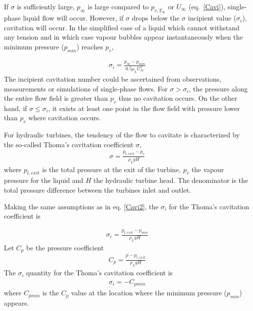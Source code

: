 If $\sigma$ is sufficiently large, $p_{\infty}$ is large compared to $p_{v,T_{\infty}}$ or $U_{\infty}$ (eq.\ \ref{Cavi}), single-phase liquid flow will occur. However, if $\sigma$ drops below the $\sigma$ incipient value ($\sigma_i$), cavitation will occur. In the simplified case of a liquid which cannot withstand any tension and in which case vapour bubbles appear instantaneously when the minimum pressure ($p_{min}$) reaches $p_{v}$,

\begin{eqnarray}
		\sigma_i=\frac{p_{\infty}-p_{min}}{0.5\rho_{L}U^2_{\infty}}
\label{Cavi2}
\end{eqnarray}
The incipient cavitation number could be ascertained from observations, measurements or simulations of single-phase flows. For $\sigma > \sigma_i$, the pressure along the entire flow field is greater than $p_v$ thus no cavitation occurs. On the other hand, if $\sigma \leq \sigma_i$, it exists at least one point in the flow field with pressure lower than $p_v$ where cavitation occurs. 


For hydraulic turbines, the tendency of the flow to cavitate is characterized by the so-called Thoma's cavitation coefficient $\sigma$, \cite{brennen1995cavitation}  
\begin{eqnarray}
		\sigma=\frac{p_{t,exit}-p_{v}}{\rho_{L}gH}
\label{Cavi3}
\end{eqnarray}
where $p_{t,exit}$ is the total pressure at the exit of the turbine, $p_v$ the vapour pressure for the liquid and $H$ the hydraulic turbine head. The denominator is the total pressure difference between the turbines inlet and outlet.   

Making the same assumptions as in eq. \ref{Cavi2}, the $\sigma_i$ for the Thoma's cavitation coefficient  is 

\begin{eqnarray}
		\sigma_i=\frac{p_{t,exit}-p_{min}}{\rho_{L}gH}
\label{Cavi4}
\end{eqnarray}
Let $C_p$ be the pressure coefficient 
\begin{eqnarray}
		C_p=\frac{p-p_{t,exit}}{\rho_{L}gH}
\label{Cpdef}
\end{eqnarray}
The $\sigma_i$ quantity for the Thoma's cavitation coefficient is 
\begin{eqnarray}
		\sigma_i=-C_{pmin}
\label{Cavi6}
\end{eqnarray}
where $C_{pmin}$ is the $C_p$ value at the location where the minimum pressure ($p_{min}$) appears.

